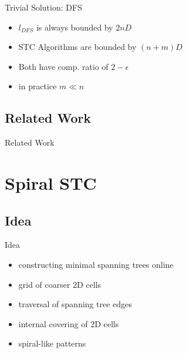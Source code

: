 \documentclass{beamer}
\begin{document}
\begin{frame}{Trivial Solution: DFS}
    \begin{itemize}
        \item $l_{DFS}$ is always bounded by $2nD$
        \item STC Algorithms are bounded by $(n + m) D$
        \item Both have comp. ratio of $2 - \epsilon$
        \item in practice $m \ll n$
    \end{itemize}
\end{frame}



\subsection{Related Work}
\begin{frame}{Related Work}
\end{frame}

\section{Spiral STC}
\subsection{Idea}
\begin{frame}{Idea}
    \begin{itemize}
        \item constructing minimal spanning trees online
        \item grid of coarser 2D cells
        \item traversal of spanning tree edges
        \item internal covering of 2D cells
        \item spiral-like patterns
    \end{itemize}
\end{frame}
\end{document}
